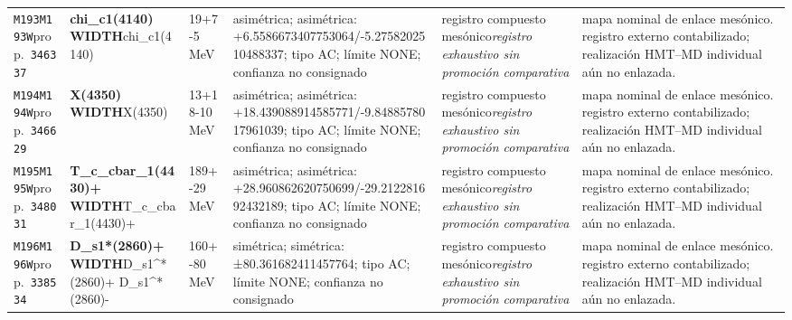 \begin{landscape}
\begin{longtable}{L{1.85cm}L{4.45cm}L{2.35cm}L{4.05cm}L{3.35cm}L{7.15cm}}
\texttt{M193}\newline \texttt{M193W}\newline prop.\ \texttt{346337} & \textbf{chi\_\allowbreak{}c1(4140) WIDTH}\newline chi\_\allowbreak{}c1(4140) & 19+7-5\,MeV & asimétrica; asimétrica: +6.5586673407753064/-5.2758202510488337; tipo AC; límite NONE; confianza no consignado & registro compuesto mesónico\newline \emph{registro exhaustivo sin promoción comparativa} & mapa nominal de enlace mesónico. registro externo contabilizado; realización HMT--MD individual aún no enlazada. \\
\texttt{M194}\newline \texttt{M194W}\newline prop.\ \texttt{346629} & \textbf{X(4350) WIDTH}\newline X(4350) & 13+18-10\,MeV & asimétrica; asimétrica: +18.439088914585771/-9.8488578017961039; tipo AC; límite NONE; confianza no consignado & registro compuesto mesónico\newline \emph{registro exhaustivo sin promoción comparativa} & mapa nominal de enlace mesónico. registro externo contabilizado; realización HMT--MD individual aún no enlazada. \\
\texttt{M195}\newline \texttt{M195W}\newline prop.\ \texttt{348031} & \textbf{T\_\allowbreak{}c\_\allowbreak{}cbar\_\allowbreak{}1(4430)+ WIDTH}\newline T\_\allowbreak{}c\_\allowbreak{}cbar\_\allowbreak{}1(4430)+ & 189+-29\,MeV & asimétrica; asimétrica: +28.960862620750699/-29.212281692432189; tipo AC; límite NONE; confianza no consignado & registro compuesto mesónico\newline \emph{registro exhaustivo sin promoción comparativa} & mapa nominal de enlace mesónico. registro externo contabilizado; realización HMT--MD individual aún no enlazada. \\
\texttt{M196}\newline \texttt{M196W}\newline prop.\ \texttt{338534} & \textbf{D\_\allowbreak{}s1*(2860)+ WIDTH}\newline D\_\allowbreak{}s1\textasciicircum{}*(2860)+ \textbar{}\allowbreak{} D\_\allowbreak{}s1\textasciicircum{}*(2860)- & 160+-80\,MeV & simétrica; simétrica: ±80.361682411457764; tipo AC; límite NONE; confianza no consignado & registro compuesto mesónico\newline \emph{registro exhaustivo sin promoción comparativa} & mapa nominal de enlace mesónico. registro externo contabilizado; realización HMT--MD individual aún no enlazada. \\

\end{longtable}
\end{landscape}
